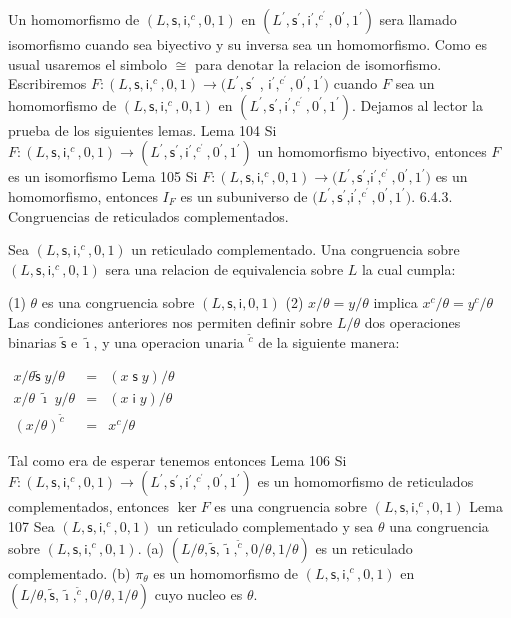 Un homomorfismo de \((L,\mathsf{s},\mathsf{i},^{c},0,1)\) en \( (L^{\prime },\mathsf{s}^{\prime },\mathsf{i}^{\prime },^{c^{\prime }},0^{\prime },1^{\prime })\) sera llamado isomorfismo cuando sea biyectivo y su inversa sea un homomorfismo. Como es usual usaremos el simbolo \(\cong \) para denotar la relacion de isomorfismo. Escribiremos \(F:(L, \mathsf{s},\mathsf{i},^{c},0,1)\rightarrow (L^{\prime },\mathsf{s}^{\prime }\) , \(\mathsf{i}^{\prime },^{c^{\prime }},0^{\prime },1^{\prime })\) cuando \(F\) sea un homomorfismo de \((L,\mathsf{s},\mathsf{i},^{c},0,1)\) en \( (L^{\prime },\mathsf{s}^{\prime },\mathsf{i}^{\prime },^{c^{\prime }},0^{\prime },1^{\prime })\). Dejamos al lector la prueba de los siguientes lemas.
Lema 104 Si \(F:(L,\mathsf{s},\mathsf{i},^{c},0,1)\rightarrow (L^{\prime },\mathsf{s} ^{\prime },\mathsf{i}^{\prime },^{c^{\prime }},0^{\prime },1^{\prime })\) un homomorfismo biyectivo, entonces \(F\) es un isomorfismo
Lema 105 Si \(F:(L,\mathsf{s},\mathsf{i},^{c},0,1)\rightarrow (L^{\prime },\mathsf{s} ^{\prime }\),\(\mathsf{i}^{\prime },^{c^{\prime }},0^{\prime },1^{\prime })\) es un homomorfismo, entonces \(I_{F}\) es un subuniverso de \((L^{\prime }, \mathsf{s}^{\prime }\),\(\mathsf{i}^{\prime },^{c^{\prime }},0^{\prime },1^{\prime })\).
6.4.3. Congruencias de reticulados complementados.

Sea \((L,\mathsf{s},\mathsf{i},^{c},0,1)\) un reticulado complementado. Una congruencia sobre \((L,\mathsf{s},\mathsf{i},^{c},0,1)\) sera una relacion de equivalencia sobre \(L\) la cual cumpla:

(1) \(\theta \) es una congruencia sobre \((L,\mathsf{s},\mathsf{i},0,1)\)
(2) \(x/\theta =y/\theta \) implica \(x^{c}/\theta =y^{c}/\theta \)
Las condiciones anteriores nos permiten definir sobre \(L/\theta \) dos operaciones binarias \(\mathsf{\tilde{s}}\) e \(\mathsf{\tilde{\imath}}\), y una operacion unaria \(^{\tilde{c}}\) de la siguiente manera:

\(\displaystyle \begin{array}{rcl} x/\theta \mathsf{\tilde{s}\;}y/\theta & =& (x\mathsf{\;s\;}y)/\theta \\ x/\theta \mathsf{\;\tilde{\imath}\;}y/\theta & =& (x\mathsf{\;i\;}y)/\theta \\ (x/\theta )^{\tilde{c}} & =& x^{c}/\theta \end{array} \)

Tal como era de esperar tenemos entonces
Lema 106 Si \(F:(L,\mathsf{s},\mathsf{i},^{c},0,1)\rightarrow (L^{\prime },\mathsf{s} ^{\prime },\mathsf{i}^{\prime },^{c^{\prime }},0^{\prime },1^{\prime })\) es un homomorfismo de reticulados complementados, entonces \(\ker F\) es una congruencia sobre \((L,\mathsf{s},\mathsf{i},^{c},0,1)\)
Lema 107 Sea \((L,\mathsf{s},\mathsf{i},^{c},0,1)\) un reticulado complementado y sea \( \theta \) una congruencia sobre \((L,\mathsf{s},\mathsf{i},^{c},0,1)\).
(a) \((L/\theta ,\mathsf{\tilde{s}},\mathsf{\tilde{\imath}},^{\tilde{c} },0/\theta ,1/\theta )\) es un reticulado complementado.
(b) \(\pi _{\theta }\) es un homomorfismo de \((L,\mathsf{s},\mathsf{i} ,^{c},0,1)\) en \((L/\theta ,\mathsf{\tilde{s}},\mathsf{\tilde{\imath}},^{ \tilde{c}},0/\theta ,1/\theta )\) cuyo nucleo es \(\theta \).
